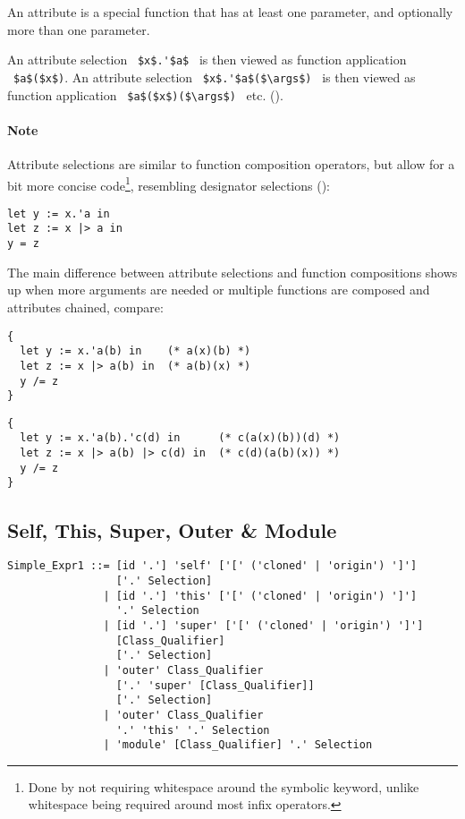 An attribute is a special function that has at least one parameter, and optionally more than one parameter. 

An attribute selection ~\lstinline!$x$.'$a$!~ is then viewed as function application ~\lstinline!$a$($x$)!. An attribute selection ~\lstinline!$x$.'$a$($\args$)!~ is then viewed as function application ~\lstinline!$a$($x$)($\args$)!~ etc. (). 

\paragraph{Note}
Attribute selections are similar to function composition operators, but allow for a bit more concise code\footnote{Done by not requiring whitespace around the symbolic keyword, unlike whitespace being required around most infix operators.}, resembling designator selections ():
\begin{lstlisting}
let y := x.'a in
let z := x |> a in
y = z
\end{lstlisting}
The main difference between attribute selections and function compositions shows up when more arguments are needed or multiple functions are composed and attributes chained, compare: 
\begin{lstlisting}
{
  let y := x.'a(b) in    (* a(x)(b) *)
  let z := x |> a(b) in  (* a(b)(x) *)
  y /= z
}
\end{lstlisting}
\begin{lstlisting}
{
  let y := x.'a(b).'c(d) in      (* c(a(x)(b))(d) *)
  let z := x |> a(b) |> c(d) in  (* c(d)(a(b)(x)) *)
  y /= z
}
\end{lstlisting}




\subsection{Self, This, Super, Outer \& Module}
\label{sec:self-this-super}

\syntax\begin{lstlisting}
Simple_Expr1 ::= [id '.'] 'self' ['[' ('cloned' | 'origin') ']']
                 ['.' Selection]
               | [id '.'] 'this' ['[' ('cloned' | 'origin') ']']
                 '.' Selection
               | [id '.'] 'super' ['[' ('cloned' | 'origin') ']']
                 [Class_Qualifier] 
                 ['.' Selection]
               | 'outer' Class_Qualifier 
                 ['.' 'super' [Class_Qualifier]] 
                 ['.' Selection]
               | 'outer' Class_Qualifier
                 '.' 'this' '.' Selection
               | 'module' [Class_Qualifier] '.' Selection
\end{lstlisting}

